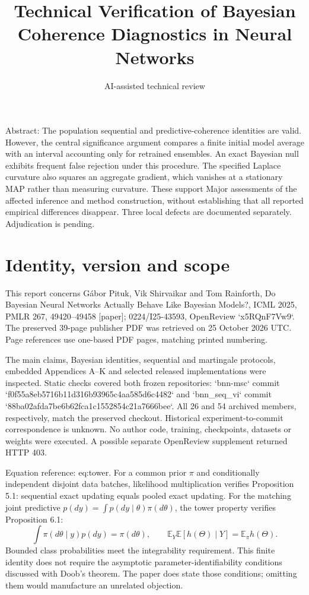 \documentclass[10pt]{article}
\title{Technical Verification of Bayesian Coherence Diagnostics in Neural Networks}
\author{AI-assisted technical review}
\date{}
\begin{document}
\maketitle
Abstract: The population sequential and predictive-coherence identities are valid. However, the central significance argument compares a finite initial model average with an interval accounting only for retrained ensembles. An exact Bayesian null exhibits frequent false rejection under this procedure. The specified Laplace curvature also squares an aggregate gradient, which vanishes at a stationary MAP rather than measuring curvature. These support Major assessments of the affected inference and method construction, without establishing that all reported empirical differences disappear. Three local defects are documented separately. Adjudication is pending.\par
\section*{Identity, version and scope}
This report concerns Gábor Pituk, Vik Shirvaikar and Tom Rainforth, Do Bayesian Neural Networks Actually Behave Like Bayesian Models?, ICML 2025, PMLR 267, 49420–49458 [paper]; 0224/I25-43593, OpenReview `x5RQnF7Vw9`. The preserved 39-page publisher PDF was retrieved on 25 October 2026 UTC. Page references use one-based PDF pages, matching printed numbering.\par
The main claims, Bayesian identities, sequential and martingale protocols, embedded Appendices A–K and selected released implementations were inspected. Static checks covered both frozen repositories: `bnn-msc` commit `f0f55a8eb5716b11d316b93965c4aa585d6c4482` and `bnn\_seq\_vi` commit `88ba02afda7be6b62fca1c1552854c21a7666bee`. All 26 and 54 archived members, respectively, match the preserved checkout. Historical experiment-to-commit correspondence is unknown. No author code, training, checkpoints, datasets or weights were executed. A possible separate OpenReview supplement returned HTTP 403.\par
Equation reference: eq:tower. For a common prior \(\pi\) and conditionally independent disjoint data batches, likelihood multiplication verifies Proposition 5.1: sequential exact updating equals pooled exact updating. For the matching joint predictive \(p(dy)=\int p(dy\mid\theta)\pi(d\theta)\), the tower property verifies Proposition 6.1: \[
\int \pi(d\theta\mid y)p(dy)=\pi(d\theta),\qquad
\mathbb E_Y\mathbb E[h(\Theta)\mid Y]=\mathbb E_\pi h(\Theta).\] Bounded class probabilities meet the integrability requirement. This finite identity does not require the asymptotic parameter-identifiability conditions discussed with Doob’s theorem. The paper does state those conditions; omitting them would manufacture an unrelated objection.\par
\end{document}
